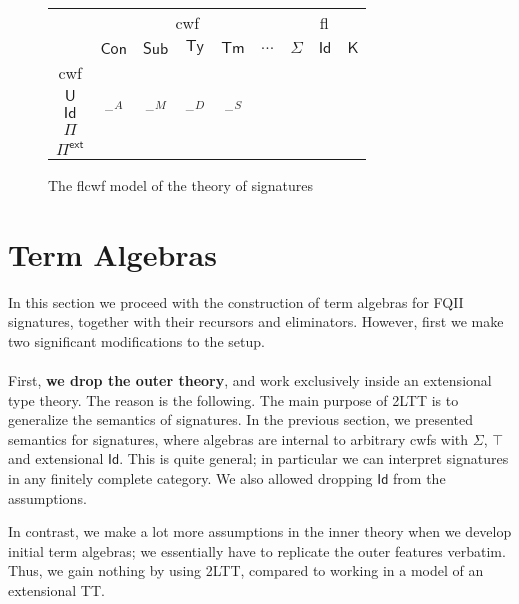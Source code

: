 \documentclass[12pt,a4paper,twoside,openany]{book}
\theoremstyle{remark}
\theoremstyle{definition}
\theoremstyle{theorem}
\newcommand{\Con}{\mathsf{Con}}
\newcommand{\Sub}{\mathsf{Sub}}
\newcommand{\Tm}{\mathsf{Tm}}
\newcommand{\Ty}{\mathsf{Ty}}
\newcommand{\U}{\mathsf{U}}
\newcommand{\Id}{\mathsf{Id}}
\newcommand{\blank}{\mathord{\hspace{1pt}\text{--}\hspace{1pt}}}
\newcommand{\Pie}{\Pi^{\mathsf{ext}}}
\newcommand{\K}{\mathsf{K}}
\begin{document}
\begin{figure}
\begin{center}
\begin{tabular}{ |c|c|c|c|c|c|c|c|c|  }
 \hline
   & \multicolumn{5}{|c|}{cwf} & \multicolumn{3}{c|}{fl}\\
 \cline{2-9}
   & $\Con$ & $\Sub$ & $\Ty$ & $\Tm$ & $...$ & $\Sigma$ & $\Id$ & $\K$ \\
 \hline
   cwf    & \multirow{5}{2em}{$\blank^A$}&\multirow{5}{2em}{$\blank^M$}&\multirow{5}{2em}{$\blank^D$}&\multirow{5}{2em}{$\blank^S$}& & & & \\
   $\U$   &                              &              &                  &    & & & & \\
   $\Id$  &                              &              &                  &    & & & & \\
   $\Pi$  &                              &              &                  &    & & & & \\
   $\Pie$ &                              &              &                  &    & & & & \\
 \hline
\end{tabular}
\end{center}
\caption{The flcwf model of the theory of signatures}
\label{fig:fqiit-model}
\end{figure}


\section{Term Algebras}
\label{sec:fqiit-term-algebras}

In this section we proceed with the construction of term algebras for FQII
signatures, together with their recursors and eliminators. However, first we
make two significant modifications to the setup.
\\\\
\indent First, \textbf{we drop the outer theory}, and work exclusively inside an
extensional type theory. The reason is the following. The main purpose of 2LTT
is to generalize the semantics of signatures. In the previous section, we
presented semantics for signatures, where algebras are internal to arbitrary
cwfs with $\Sigma$, $\top$ and extensional $\Id$. This is quite general; in
particular we can interpret signatures in any finitely complete category. We
also allowed dropping $\Id$ from the assumptions.


In contrast, we make a lot more assumptions in the inner theory when we develop
initial term algebras; we essentially have to replicate the outer features
verbatim.  Thus, we gain nothing by using 2LTT, compared to working in a model
of an extensional TT.
\end{document}
